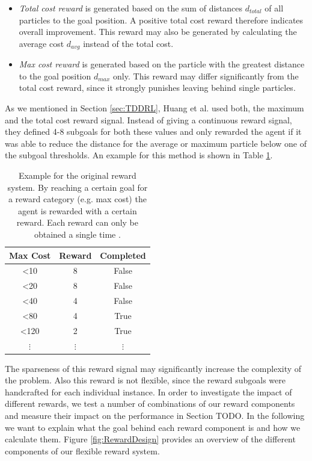 \begin{itemize}
    \item \textit{Total cost reward} is generated based on the sum of distances $d_{total}$ of all particles to the goal position. A positive total cost reward therefore indicates overall improvement. This reward may also be generated by calculating the average cost $d_{avg}$ instead of the total cost.
    \item \textit{Max cost reward} is generated based on the particle with the greatest distance to the goal position $d_{max}$ only. This reward may differ significantly from the total cost reward, since it strongly punishes leaving behind single particles. 
\end{itemize}

As we mentioned in Section \ref{sec:TDDRL}, Huang et al. used both, the maximum and the total cost reward signal. Instead of giving a continuous reward signal, they defined 4-8 subgoals for both these values and only rewarded the agent if it was able to reduce the distance for the average or maximum particle below one of the subgoal thresholds. An example for this method is shown in Table \ref{tab:OriginalRewards}.

\begin{table} [ht]
    \begin{center}
        \begin{tabular}{|c|c|c|}
            \hline
            Max Cost & Reward & Completed \\
            \hline
            <10 & 8 & False \\
            <20 & 8 & False \\
            <40 & 4 & False \\
            <80 & 4 & True \\
            <120 & 2 & True \\
            $\vdots$ & $\vdots$ & $\vdots$ \\
            \hline
        \end{tabular}
    \end{center}
    \caption[Original Reward Example]{Example for the original reward system. By reaching a certain goal for a reward category (e.g. max cost) the agent is rewarded with a certain reward. Each reward can only be obtained a single time \cite{huang2019}.} \label{tab:OriginalRewards}
\end{table}


The sparseness of this reward signal may significantly increase the complexity of the problem. Also this reward is not flexible, since the reward subgoals were handcrafted for each individual instance. In order to investigate the impact of different rewards, we test a number of combinations of our reward components and measure their impact on the performance in Section TODO. In the following we want to explain what the goal behind each reward component is and how we calculate them. Figure \ref{fig:RewardDesign} provides an overview of the different components of our flexible reward system.

